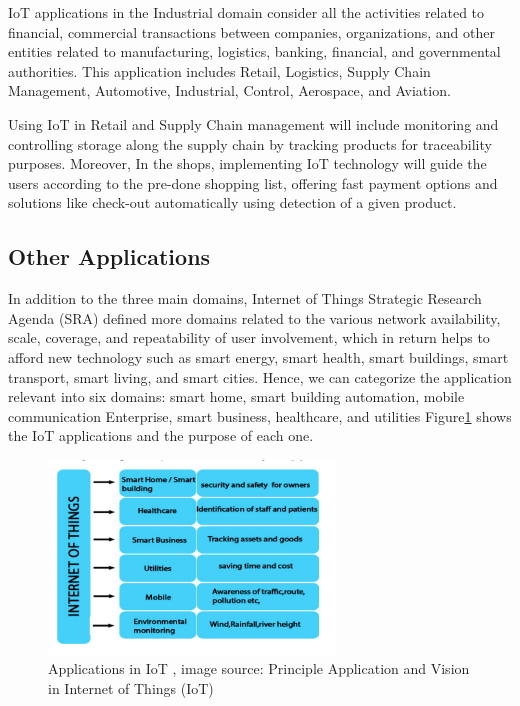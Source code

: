 \documentclass[conference]{IEEEtran}
\begin{document}
IoT applications in the Industrial domain consider all the activities related to financial, commercial transactions between companies, organizations, and other entities related to manufacturing, logistics, banking, financial, and governmental authorities. This application includes Retail, Logistics, Supply Chain Management, Automotive, Industrial, Control, Aerospace, and Aviation. \cite{por5}

Using  IoT in Retail and Supply Chain management will include monitoring and controlling storage along the supply chain by tracking products for traceability purposes. Moreover,  In the shops, implementing IoT technology will guide the users according to the pre-done shopping list, offering fast payment options and solutions like check-out automatically using detection of a given product. \cite{por6}

\subsection{Other Applications}

In addition to the three main domains, Internet of Things Strategic Research Agenda (SRA) \cite{SRA1} defined more domains related to the various network availability, scale, coverage, and repeatability of user involvement, which in return helps to afford new technology such as smart energy, smart health, smart buildings, smart transport, smart living, and smart cities. Hence, we can categorize the application relevant into six domains: smart home, smart building automation, mobile communication Enterprise, smart business, healthcare, and utilities Figure\ref{Applications} shows the IoT applications and the purpose of each one. 


\begin{figure}[h!]
	\centering
	\includegraphics[width=3in]{Applications.png}
	\caption{\label{Applications}  Applications in IoT  , image source: 
		Principle Application and Vision in Internet
		of Things (IoT)\cite{App1} }
\end{figure}
\end{document}
